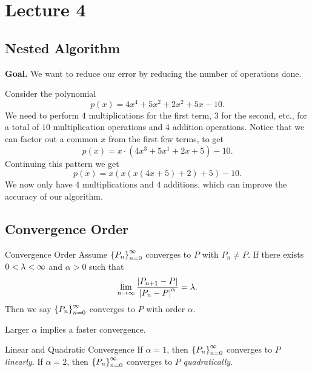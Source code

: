 \documentclass[class=article, crop=false]{standalone}
\begin{document}
  \section{Lecture 4}
  \subsection{Nested Algorithm}
  \textbf{Goal.} We want to reduce our error by reducing the number of operations done.
  \begin{example}{}
    Consider the polynomial
    \[
      p(x) = 4x^4 + 5x^2 + 2x^2 + 5x - 10.
    \]
    We need to perform $4$ multiplications for the first term, $3$ for the second, etc., for a total of $10$ multiplication operations and $4$ addition operations. Notice that we can factor out a common $x$ from the first few terms, to get
    \[
      p(x) = x\cdot (4x^3 + 5x^1 + 2x + 5) - 10.
    \]
    Continuing this pattern we get
    \[
      p(x) = x(x(x(4x + 5) + 2) + 5) - 10.
    \]
    We now only have $4$ multiplications and $4$ additions, which can improve the accuracy of our algorithm.
  \end{example}
  \subsection{Convergence Order}
  \begin{definition}{Convergence Order}
    Assume $\left\{P_n\right\}_{n = 0}^\infty$ converges to $P$ with $P_n\neq P$. If there exists $0 < \lambda < \infty$ and $\alpha > 0$ such that
    \[
      \lim_{n\to \infty} \frac{\left\lvert P_{n + 1} - P \right\rvert}{\left\lvert P_n - P \right\rvert^\alpha} = \lambda.
    \]
    Then we say $\left\{P_n\right\}_{n = 0}^\infty$ converges to $P$ with order $\alpha$.
  \end{definition}
  \begin{note}{}
    Larger $\alpha$ implies a faster convergence.
  \end{note}
  \begin{definition}{Linear and Quadratic Convergence}
    If $\alpha = 1$, then $\left\{P_n\right\}_{n = 0}^\infty$ converges to $P$ \emph{linearly}. If $\alpha = 2$, then $\left\{P_n\right\}_{n = 0}^\infty$ converges to $P$ \emph{quadratically}. 
  \end{definition}
\end{document}
